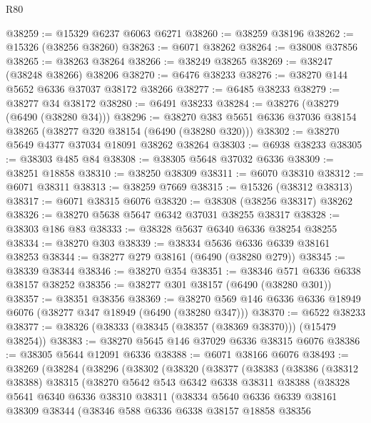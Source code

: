 \begin{lexlean}{R80}
\begin{coremodule}
@38259 := @15329 @6237 @6063 @6271
@38260 := @38259 @38196
@38262 := @15326 (@38256 @38260)
@38263 := @6071 @38262
@38264 := @38008 @37856
@38265 := @38263 @38264
@38266 := @38249 @38265
@38269 := @38247 (@38248 @38266) @38206
@38270 := @6476 @38233
@38276 := @38270 @144 @5652 @6336 @37037 @38172 @38266
@38277 := @6485 @38233
@38279 := @38277 @34 @38172
@38280 := @6491 @38233
@38284 := @38276 (@38279 (@6490 (@38280 @34)))
@38296 := @38270 @383 @5651 @6336 @37036 @38154 @38265 (@38277 @320 @38154 (@6490 (@38280 @320)))
@38302 := @38270 @5649 @4377 @37034 @18091 @38262 @38264
@38303 := @6938 @38233
@38305 := @38303 @485 @84
@38308 := @38305 @5648 @37032 @6336
@38309 := @38251 @18858
@38310 := @38250 @38309
@38311 := @6070 @38310
@38312 := @6071 @38311
@38313 := @38259 @7669
@38315 := @15326 (@38312 @38313)
@38317 := @6071 @38315 @6076
@38320 := @38308 (@38256 @38317) @38262
@38326 := @38270 @5638 @5647 @6342 @37031 @38255 @38317
@38328 := @38303 @186 @83
@38333 := @38328 @5637 @6340 @6336 @38254 @38255
@38334 := @38270 @303
@38339 := @38334 @5636 @6336 @6339 @38161 @38253
@38344 := @38277 @279 @38161 (@6490 (@38280 @279))
@38345 := @38339 @38344
@38346 := @38270 @354
@38351 := @38346 @571 @6336 @6338 @38157 @38252
@38356 := @38277 @301 @38157 (@6490 (@38280 @301))
@38357 := @38351 @38356
@38369 := @38270 @569 @146 @6336 @6336 @18949 @6076 (@38277 @347 @18949 (@6490 (@38280 @347)))
@38370 := @6522 @38233
@38377 := @38326 (@38333 (@38345 (@38357 (@38369 @38370))) (@15479 @38254))
@38383 := @38270 @5645 @146 @37029 @6336 @38315 @6076
@38386 := @38305 @5644 @12091 @6336
@38388 := @6071 @38166 @6076
@38493 := @38269
    (@38284
      (@38296
        (@38302
          (@38320
            (@38377
              (@38383
                (@38386
                  (@38312 @38388)
                  @38315
                  (@38270
                    @5642
                    @543
                    @6342
                    @6338
                    @38311
                    @38388
                    (@38328
                      @5641
                      @6340
                      @6336
                      @38310
                      @38311
                      (@38334
                        @5640
                        @6336
                        @6339
                        @38161
                        @38309
                        @38344
                        (@38346
                          @588
                          @6336
                          @6338
                          @38157
                          @18858
                          @38356

\end{coremodule}
\end{lexlean}
